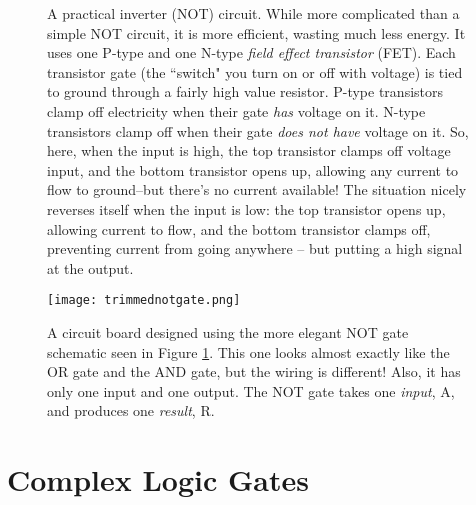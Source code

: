 \begin{figure}[h!]
\begin{center}


\caption{A practical inverter (NOT) circuit. While more complicated than a simple NOT circuit, it is more efficient, wasting much less energy. It uses one P-type and one N-type \emph{field effect transistor} (FET). Each transistor gate (the ``switch" you turn on or off with voltage) is tied to ground through a fairly high value resistor. P-type transistors clamp off electricity when their gate \emph{has} voltage on it. N-type transistors clamp off when their gate \emph{does not have} voltage on it. So, here, when the input is high, the top transistor clamps off voltage input, and the bottom transistor opens up, allowing any current to flow to ground--but there's no current available! The situation nicely reverses itself when the input is low: the top transistor opens up, allowing current to flow, and the bottom transistor clamps off, preventing current from going anywhere -- but putting a high signal at the output.  }
\label{fig:cmosnot}
\end{center}
\end{figure}


\begin{figure}[h!]
\begin{center}
\texttt{[image: trimmednotgate.png]} %
\caption{A circuit board designed using the more elegant NOT gate schematic seen in Figure \ref{fig:cmosnot}. This one looks almost exactly like the OR gate and the AND gate, but the wiring is different! Also, it has only one input and one output. The NOT gate takes one \emph{input}, A, and produces one \emph{result}, R.}
\label{fig:notgateboard}
\end{center}
\end{figure}

\begin{table}

\caption{The list of components needed to solder up the NOT gate seen in Figures \ref{fig:cmosnot} and \ref{fig:notgateboard}.}

\end{table}

\clearpage
\newpage

\section{Complex Logic Gates}

